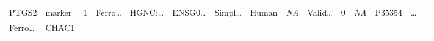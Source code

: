 \documentclass[
]{article}
\begin{document}
\begin{longtable}[]{@{}lllllllllllllll@{}}
\begin{minipage}[t]{0.04\columnwidth}
PTGS2\strut
\end{minipage} & \begin{minipage}[t]{0.04\columnwidth}\raggedright
marker\strut
\end{minipage} & \begin{minipage}[t]{0.02\columnwidth}\raggedright
1\strut
\end{minipage} & \begin{minipage}[t]{0.05\columnwidth}\raggedright
Ferro\ldots{}\strut
\end{minipage} & \begin{minipage}[t]{0.05\columnwidth}\raggedright
HGNC:\ldots{}\strut
\end{minipage} & \begin{minipage}[t]{0.05\columnwidth}\raggedright
ENSG0\ldots{}\strut
\end{minipage} & \begin{minipage}[t]{0.05\columnwidth}\raggedright
Simpl\ldots{}\strut
\end{minipage} & \begin{minipage}[t]{0.04\columnwidth}\raggedright
Human\strut
\end{minipage} & \begin{minipage}[t]{0.05\columnwidth}\raggedright
\emph{NA}\strut
\end{minipage} & \begin{minipage}[t]{0.05\columnwidth}\raggedright
Valid\ldots{}\strut
\end{minipage} & \begin{minipage}[t]{0.05\columnwidth}\raggedright
0\strut
\end{minipage} & \begin{minipage}[t]{0.05\columnwidth}\raggedright
\emph{NA}\strut
\end{minipage} & \begin{minipage}[t]{0.05\columnwidth}\raggedright
P35354\strut
\end{minipage} & \begin{minipage}[t]{0.02\columnwidth}\raggedright
\ldots{}\strut
\end{minipage}\tabularnewline
\begin{minipage}[t]{0.05\columnwidth}\raggedright
Ferro\ldots{}\strut
\end{minipage} & \begin{minipage}[t]{0.04\columnwidth}\raggedright
CHAC1\strut
\end{minipage} & \begin{minipage}[t]{0.04\columnwidth}\raggedright

\end{minipage}
\end{longtable}
\end{document}

